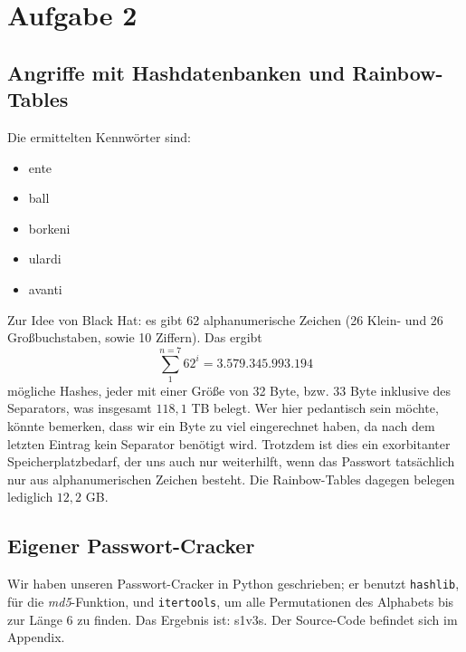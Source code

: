 \documentclass[12pt,a4paper]{article}
\begin{document}
\setcounter{section}{2}
\setcounter{subsection}{0}
\section*{Aufgabe 2}
\subsection{Angriffe mit Hashdatenbanken und Rainbow-Tables}
Die ermittelten Kennwörter sind:
\begin{itemize}
\item ente
\item ball
\item borkeni
\item ulardi
\item avanti
\end{itemize}
Zur Idee von Black Hat:
es gibt 62 alphanumerische Zeichen (26 Klein- und 26 Großbuchstaben, sowie 10 Ziffern).
Das ergibt $$ \sum_1^{n=7} 62^i = 3.579.345.993.194 $$ mögliche Hashes, jeder mit einer
Größe von 32 Byte, bzw. 33 Byte inklusive des Separators, was insgesamt $118,1$ TB belegt.
Wer hier pedantisch sein möchte, könnte bemerken, dass wir ein Byte zu viel eingerechnet
haben, da nach dem letzten Eintrag kein Separator benötigt wird. Trotzdem ist dies ein
exorbitanter Speicherplatzbedarf, der uns auch nur weiterhilft, wenn das Passwort
tatsächlich nur aus alphanumerischen Zeichen besteht. Die Rainbow-Tables dagegen belegen
lediglich $12,2$ GB.

\subsection{Eigener Passwort-Cracker}
Wir haben unseren Passwort-Cracker in Python geschrieben; er benutzt \texttt{hashlib},
für die \textit{md5}-Funktion, und \texttt{itertools}, um alle Permutationen
des Alphabets bis zur Länge 6 zu finden.
Das Ergebnis ist: s1v3s.
Der Source-Code befindet sich im Appendix.
\end{document}

